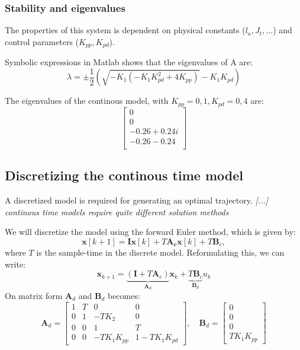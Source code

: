 \documentclass[../main.tex]{subfiles}
\begin{document}
\subsubsection{Stability and eigenvalues}
The properties of this system is dependent on physical constants ($l_a, J_t, ...$) and control parameters ($K_{pp}, K_{pd}$).

Symbolic expressions in Matlab shows that the eigenvalues of A are:
\begin{equation}
	\lambda = \pm \frac{1}{2} \left( \sqrt{-K_1 (-K_1 K_{pd}^2 + 4  K_{pp})} - K_1  K_{pd} \right)
\end{equation}

The eigenvalues of the continous model, with $K_{pp} = 0,1 , K_{pd} = 0,4$ are:
\begin{equation}\label{eq:lab2_ss_c_eigenvalues_example}
	\begin{bmatrix}
		0 \\ 0 \\ -0.26 + 0.24i \\ -0.26 - 0.24 \\
	\end{bmatrix}
\end{equation}

\subsection{Discretizing the continous time model} \label{sec:lab2_disc}
A discretized model is required for generating an optimal trajectory. \textit{[...] continous time models require quite different solution methods} \cite{FossHeirung}

We will discretize the model using the forward Euler method, which is given by:
\begin{equation}\label{eq:lab2_forward_euler}
	\bm{x}[k + 1] = \bm I \bm x[k] + T\bm{A_c x}[k] + T\bm B_c ,
\end{equation}
where $ T $ is the sample-time in the discrete model.
Reformulating this, we can write:
\begin{equation}\label{eq:lab2_discrete_system}
	\bm{x}_{k + 1} = \underbrace{(\bm I + T \bm A_c)}_{\bm A_d} \bm{x}_{k} + \underbrace{T \bm B_c}_{\bm B_d} u_k
\end{equation}
On matrix form $ \bm A_d $ and $ \bm B_d $ becomes: 
\begin{equation}
	\bm A_d = \begin{bmatrix}
		1 & T & 0 & 0 \\
		0 & 1 & -T K_2 & 0 \\
		0 & 0 & 1 & T \\
		0 & 0 & -T K_1 K_{pp} &  1 - T K_1 K_{pd}
	\end{bmatrix}, \quad 
	\bm B_d = \begin{bmatrix}
		0 \\ 0 \\ 0 \\T K_1 K_{pp}
	\end{bmatrix}
\end{equation}
\end{document}
